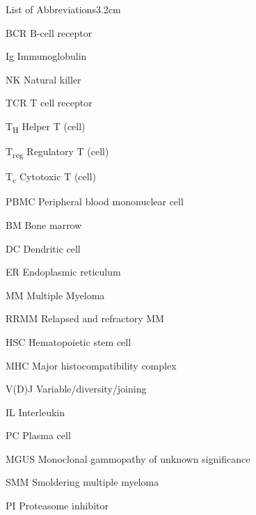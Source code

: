 \begin{mclistof}{List of Abbreviations}{3.2cm}

\item[BCR] B-cell receptor

\item[Ig] Immunoglobulin

\item[NK] Natural killer

\item[TCR] T cell receptor

\item[T\textsubscript{H}] Helper T (cell)

\item[T\textsubscript{reg}] Regulatory T (cell)

\item[T\textsubscript{c}] Cytotoxic T (cell)

\item[PBMC] Peripheral blood mononuclear cell

\item[BM] Bone marrow

\item[DC] Dendritic cell

\item[ER] Endoplasmic reticulum

\item[MM] Multiple Myeloma

\item[RRMM] Relapsed and refractory MM

\item[HSC] Hematopoietic stem cell

\item[MHC] Major histocompatibility complex

\item[V(D)J] Variable/diversity/joining

\item[IL] Interleukin

\item[PC] Plasma cell

\item[MGUS] Monoclonal gammopathy of unknown significance

\item[SMM] Smoldering multiple myeloma

\item[PI] Proteasome inhibitor


\end{mclistof}
